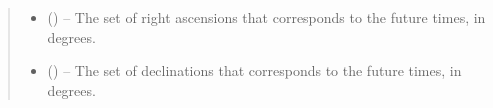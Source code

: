 \documentclass[letterpaper,11pt,english]{sphinxmanual}
\begin{document}
\begin{savenotes}
\begin{fulllineitems}
\begin{savenotes}
\begin{fulllineitems}
\begin{quote}
\begin{description}
\sphinxAtStartPar
\begin{itemize}
\item {} 
\sphinxAtStartPar
{} () – The set of right ascensions that corresponds to the future times,
in degrees.

\item {} 
\sphinxAtStartPar
{} () – The set of declinations that corresponds to the future times, in
degrees.

\end{itemize}


\end{description}\end{quote}

\end{fulllineitems}\end{savenotes}


\end{fulllineitems}\end{savenotes}

\end{document}
